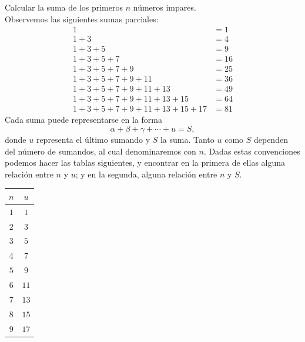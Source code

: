 \begin{Problem}
    Calcular la suma de los primeros $n$ números impares. \\
    \solucion Observemos las siguientes sumas parciales:
    \begin{align*}
        1 &=1 \\
        1+3 &=4 \\
        1+3+5 &=9 \\
        1+3+5+7 &=16 \\
        1+3+5+7+9 &=25 \\
        1+3+5+7+9+11 &=36 \\
        1+3+5+7+9+11+13 &=49 \\
        1+3+5+7+9+11+13+15 &=64 \\
        1+3+5+7+9+11+13+15+17 &=81
    \end{align*}
    Cada suma puede representarse en la forma
    $$\alpha + \beta + \gamma + \cdots + u = S,$$
    donde $u$ representa el último sumando y $S$ la suma. Tanto $u$ como $S$ dependen del número de sumandos, al cual denominaremos con $n$. Dadas estas convenciones podemos hacer las tablas siguientes, y encontrar en la primera de ellas alguna relación entre $n$ y $u$; y en la segunda, alguna relación entre $n$ y $S$.
    \begin{table}[h!]
        \begin{minipage}{.4\textwidth}
        \centering
            \begin{tabular}{cc}
                \toprule
                $n$ & $u$ \\
                \midrule
                $1$ & $1$ \\
                $2$ & $3$ \\
                $3$ & $5$ \\
                $4$ & $7$ \\
                $5$ & $9$ \\
                $6$ & $11$ \\
                $7$ & $13$ \\
                $8$ & $15$ \\
                $9$ & $17$ \\
                \bottomrule

\end{tabular}
\end{minipage}
\end{table}
\end{Problem}
